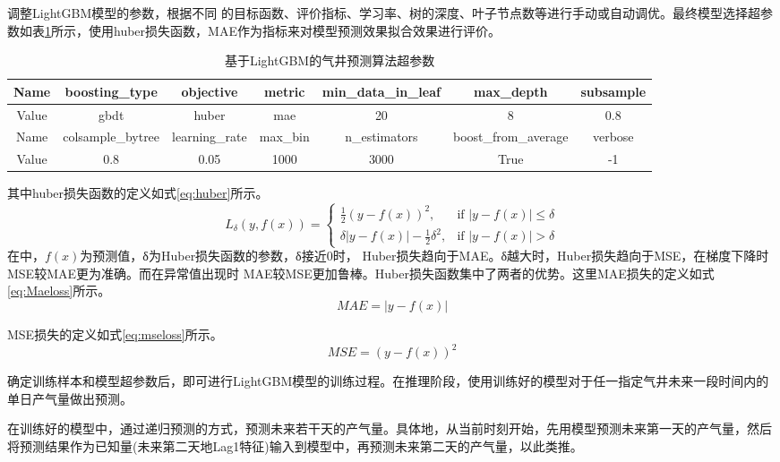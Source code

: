 调整LightGBM模型的参数，根据不同
的目标函数、评价指标、学习率、树的深度、叶子节点数等进行手动或自动调优。最终模型选择超参数如表\ref{tab:LightGBMSuper}所示，使用huber损失函数，MAE作为指标来对模型预测效果拟合效果进行评价。
\begin{table}[H]
    \renewcommand{\arraystretch}{1.5}
    \centering
    \caption{基于LightGBM的气井预测算法超参数}
    \label{tab:LightGBMSuper}
    \begin{tabular}{|c|c|c|c|c|c|c|}
        \hline
        Name & boosting\_type & objective & metric & min\_data\_in\_leaf & max\_depth & subsample \\
        \hline
        Value & gbdt & huber & mae & 20 &8 & 0.8 \\
        \hline
        Name & colsample\_bytree & learning\_rate & max\_bin & n\_estimators & boost\_from\_average & verbose \\
        \hline
        Value & 0.8 & 0.05 & 1000 & 3000 & True & -1 \\
        \hline
    \end{tabular}
\end{table}
其中huber损失函数的定义如式\eqref{eq:huber}所示。
\begin{equation}
    L_{\delta}(y, f(x)) = 
        \begin{cases} 
        \frac{1}{2}(y - f(x))^2, & \text{if } |y - f(x)| \leq \delta \\
        \delta|y - f(x)| - \frac{1}{2}\delta^2, & \text{if } |y - f(x)| > \delta
        \end{cases}
    \label{eq:huber}
\end{equation}
在中，\(f(x)\)为预测值，δ为Huber损失函数的参数，δ接近0时，
Huber损失趋向于MAE。δ越大时，Huber损失趋向于MSE，在梯度下降时 MSE较MAE更为准确。而在异常值出现时 MAE较MSE更加鲁棒。Huber损失函数集中了两者的优势。这里MAE损失的定义如式\eqref{eq:Maeloss}所示。
\begin{equation}
    MAE = |y - f(x)|
    \label{eq:Maeloss}
\end{equation}

MSE损失的定义如式\eqref{eq:mseloss}所示。
\begin{equation}
    MSE = (y - f(x))^2
    \label{eq:mseloss}
\end{equation}

确定训练样本和模型超参数后，即可进行LightGBM模型的训练过程。在推理阶段，使用训练好的模型对于任一指定气井未来一段时间内的单日产气量做出预测。

在训练好的模型中，通过递归预测的方式，预测未来若干天的产气量。具体地，从当前时刻开始，先用模型预测未来第一天的产气量，然后将预测结果作为已知量(未来第二天地Lag1特征)输入到模型中，再预测未来第二天的产气量，以此类推。
